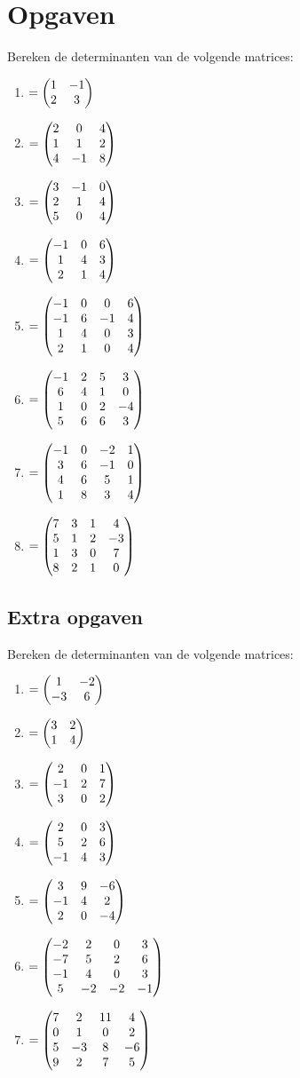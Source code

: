 \newpage 
\section{Opgaven}
Bereken de determinanten van de volgende matrices:

\begin{enumerate}[label=\Alph*]
    \setlength{\itemsep}{5pt}
	\item $ = \begin{pmatrix} 1 & -1 \\  2 & 3 \end{pmatrix} $
 
	\item $ = \begin{pmatrix} 2 & 0 & 4 \\ 1 & 1 & 2 \\ 4 & -1 & 8 \end{pmatrix} $ 
 
	\item $ = \begin{pmatrix} 3 & -1 & 0 \\ 2 & 1 & 4 \\ 5 & 0 & 4 \end{pmatrix} $
 
	\item $ = \begin{pmatrix} -1 & 0 & 6 \\ 1 & 4 & 3 \\ 2 & 1 & 4 \end{pmatrix} $
 
	\item $ = \begin{pmatrix} -1 & 0 &  0 & 6 \\ -1 & 6 & -1 & 4 \\ 1 & 4 & 0 & 3 \\ 2 & 1 & 0 & 4 \end{pmatrix} $
	
    \item $ = \begin{pmatrix} -1 & 2 &  5 & 3 \\ 6 & 4 & 1 & 0 \\ 1 & 0 & 2 & -4 \\ 5 & 6 & 6 & 3 \end{pmatrix} $
    
	\item $ = \begin{pmatrix} -1 & 0 &  -2 & 1 \\ 3 & 6 & -1 & 0 \\ 4 & 6 & 5 & 1 \\ 1 & 8 & 3 & 4 \end{pmatrix} $ 
 
	\item $ = \begin{pmatrix} 7 & 3 &  1 & 4 \\ 5 & 1 & 2 & -3 \\ 1 & 3 & 0 & 7 \\ 8 & 2 & 1 & 0 \end{pmatrix} $
\end{enumerate}

\newpage
\subsection{Extra opgaven}
Bereken de determinanten van de volgende matrices:

\begin{enumerate}[label=\Alph*]
    \setlength{\itemsep}{5pt}
	\item $ = \begin{pmatrix} 1 & -2 \\  -3 & 6 \end{pmatrix} $
 
    \item $ = \begin{pmatrix} 3 & 2  \\ 1 & 4  \end{pmatrix} $ 
    
    \item $ = \begin{pmatrix} 2 & 0 & 1 \\ -1 & 2 & 7 \\ 3 & 0 & 2 \end{pmatrix} $ 
    
	\item $ = \begin{pmatrix} 2 & 0 & 3 \\ 5 & 2 & 6 \\ -1 & 4 & 3 \end{pmatrix} $ 
 
	\item $ = \begin{pmatrix} 3 & 9 &  -6  \\ -1 & 4 & 2  \\ 2 & 0 & -4  \end{pmatrix}$
 
	\item $ =  \begin{pmatrix} -2 & 2 &  0 & 3 \\ -7 & 5 & 2 & 6 \\ -1 & 4 & 0 & 3 \\ 5 & -2 & -2 & -1 \end{pmatrix} $
 
	\item $ = \begin{pmatrix} 7 & 2 &  11 & 4 \\ 0 & 1 & 0 & 2 \\ 5 & -3 & 8 & -6 \\ 9 & 2 & 7 & 5 \end{pmatrix} $
\end{enumerate}
